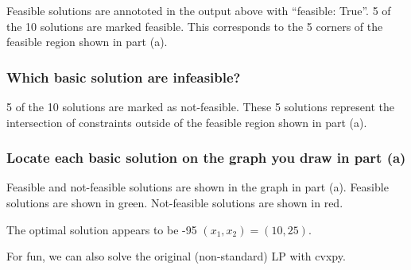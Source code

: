 \documentclass[11pt]{article}
\begin{document}
Feasible solutions are annototed in the output above with ``feasible:
True''. 5 of the 10 solutions are marked feasible. This corresponds to
the 5 corners of the feasible region shown in part (a).

\hypertarget{which-basic-solution-are-infeasible}{%
\subsubsection{Which basic solution are
infeasible?}\label{which-basic-solution-are-infeasible}}

5 of the 10 solutions are marked as not-feasible. These 5 solutions
represent the intersection of constraints outside of the feasible region
shown in part (a).

\hypertarget{locate-each-basic-solution-on-the-graph-you-draw-in-part-a}{%
\subsubsection{Locate each basic solution on the graph you draw in part
(a)}\label{locate-each-basic-solution-on-the-graph-you-draw-in-part-a}}

Feasible and not-feasible solutions are shown in the graph in part (a).
Feasible solutions are shown in green. Not-feasible solutions are shown
in red.

The optimal solution appears to be -95 \((x_1, x_2) = (10,25)\).

For fun, we can also solve the original (non-standard) LP with cvxpy.
\end{document}
